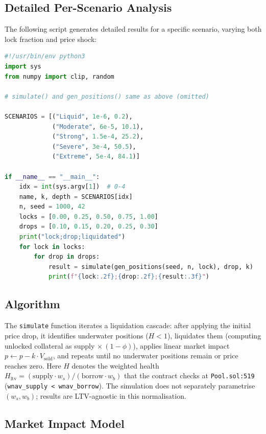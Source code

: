 \documentclass[10pt,a4paper,twocolumn]{article}
\begin{document}
\subsection{Detailed Per-Scenario Analysis}

The following script generates detailed results for a specific scenario, varying both lock fraction and price shock:

\begin{lstlisting}[language=Python, caption={Detailed cascade simulation}, label=lst:cascade-detail]
#!/usr/bin/env python3
import sys
from numpy import clip, random

# simulate() and gen_positions() same as above (omitted)

SCENARIOS = [("Liquid", 1e-6, 0.2),
             ("Moderate", 6e-5, 10.1),
             ("Strong", 1.5e-4, 25.2),
             ("Severe", 3e-4, 50.5),
             ("Extreme", 5e-4, 84.1)]

if __name__ == "__main__":
    idx = int(sys.argv[1])  # 0-4
    name, k, depth = SCENARIOS[idx]
    n, seed = 1000, 42
    locks = [0.00, 0.25, 0.50, 0.75, 1.00]
    drops = [0.10, 0.15, 0.20, 0.25, 0.30]
    print("lock;drop;liquidated")
    for lock in locks:
        for drop in drops:
            result = simulate(gen_positions(seed, n, lock), drop, k)
            print(f"{lock:.2f};{drop:.2f};{result:.3f}")
\end{lstlisting}

\subsection{Algorithm}

The \texttt{simulate} function iterates a liquidation cascade: after applying the initial price drop, it identifies underwater positions ($H < 1$), liquidates them (computing unlocked collateral as supply $\times\,(1{-}\phi)$), applies linear market impact $p \leftarrow p - k \cdot V_{\text{sold}}$, and repeats until no underwater positions remain or price reaches zero. Here $H$ denotes the weighted health $H_{\text{ltv}} = (\text{supply} \cdot w_s)/(\text{borrow} \cdot w_b)$ that the contract checks at \texttt{Pool.sol:519} (\texttt{wnav\_supply < wnav\_borrow}). The simulation does not separately parametrise $(w_s, w_b)$; results are LTV-agnostic in this normalisation.

\subsection{Market Impact Model}
\end{document}
